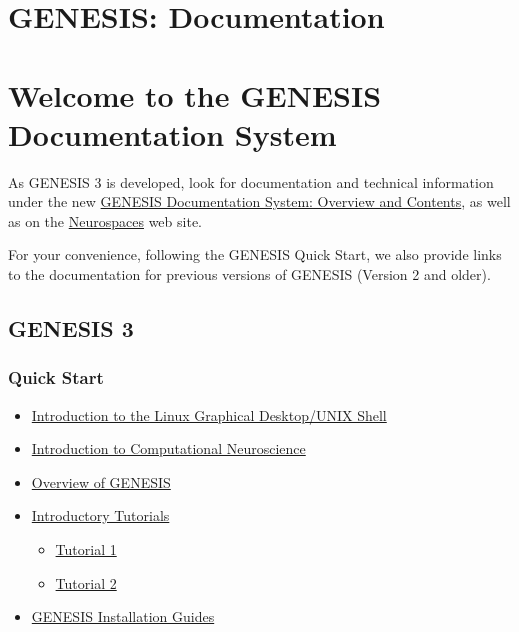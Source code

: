 \documentclass[12pt]{article}
\begin{document}
\section*{GENESIS: Documentation}

\section*{Welcome to the GENESIS Documentation System}

As GENESIS 3 is developed, look for documentation and technical information under the new \href{../documentation-overview/documentation-overview.tex}{GENESIS Documentation System: Overview and Contents}, as well as on the \href{http://www.neurospaces.org}{Neurospaces} web site.

For your convenience, following the GENESIS Quick Start, we also provide links to the documentation for previous versions of GENESIS (Version 2 and older).

\subsection*{GENESIS 3}

\subsubsection*{Quick Start}

\begin{itemize}

\item \href{../unix-linux/unix-linux.tex}{Introduction to the Linux Graphical Desktop/UNIX Shell}

\item \href{../compneurosci-1/compneurosci-1.tex}{Introduction to Computational Neuroscience}

\item \href{../genesis-overview/genesis-overview.tex}{Overview of GENESIS}

\item \href{../contents-level1/contents-level1.tex}{Introductory Tutorials}
  \begin{itemize}
  \item \href{../tutorial1/tutorial1.tex}{Tutorial 1}

  \item \href{../tutorial2/tutorial2.tex}{Tutorial 2}
  \end{itemize}

\item \href{../installation/installation.tex}{GENESIS Installation Guides}

\end{itemize}
\end{document}
